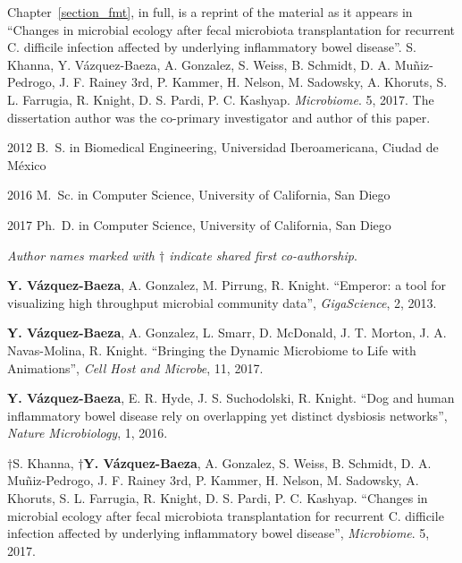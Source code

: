 \begin{frontmatter}
\begin{acknowledgements}
    Chapter~\ref{section_fmt}, in full, is a reprint of the material as it 
    appears in ``Changes in microbial ecology after fecal microbiota 
    transplantation for recurrent C. difficile infection affected by underlying 
    inflammatory bowel disease''. S. Khanna, Y.  V\'azquez-Baeza, A.  Gonzalez, 
    S. Weiss, B.  Schmidt, D. A.  Muñiz-Pedrogo, J. F. Rainey 3rd, P. Kammer, 
    H. Nelson, M.  Sadowsky, A.  Khoruts, S. L. Farrugia, R. Knight, D. S.  
    Pardi, P. C.  Kashyap. \emph{Microbiome}. 5, 2017. The dissertation author 
    was the co-primary investigator and author of this paper.

\end{acknowledgements}


%
%
\begin{vitapage}
\begin{vita}
  \item[2012] B.~S. in Biomedical Engineering, Universidad Iberoamericana, Ciudad de M\'exico
  \item[2016] M.~Sc. in Computer Science, University of California, San Diego
  \item[2017] Ph.~D. in Computer Science, University of California, San Diego 
\end{vita}


\begin{publications}

    \item \textsl{Author names marked with $\dagger$ indicate shared first co-authorship}.

    \item \textbf{Y. V\'azquez-Baeza}, A. Gonzalez, M. Pirrung, R. Knight. ``Emperor: a tool for visualizing high throughput microbial community data'', \emph{GigaScience}, 2, 2013.

    \item \textbf{Y. V\'azquez-Baeza}, A. Gonzalez, L. Smarr, D. McDonald, J. T. Morton, J. A. Navas-Molina, R. Knight. ``Bringing the Dynamic Microbiome to Life with Animations'', \emph{Cell Host and Microbe}, 11, 2017.

    \item \textbf{Y. V\'azquez-Baeza}, E. R. Hyde, J. S. Suchodolski, R. Knight. ``Dog and human inflammatory bowel disease rely on overlapping yet distinct dysbiosis networks'', \emph{Nature Microbiology}, 1, 2016.

    \item  $\dagger$S. Khanna, \textbf{$\dagger$Y. V\'azquez-Baeza}, A.  
        Gonzalez, S. Weiss, B. Schmidt, D. A. Muñiz-Pedrogo, J. F. Rainey 3rd, 
        P. Kammer, H. Nelson, M. Sadowsky, A. Khoruts, S. L. Farrugia, R.  
        Knight, D. S. Pardi, P. C. Kashyap. ``Changes in microbial ecology 
        after fecal microbiota transplantation for recurrent C. difficile 
        infection affected by underlying inflammatory bowel disease'', 
        \emph{Microbiome}. 5, 2017.


\end{publications}
\end{vitapage}
\end{frontmatter}
